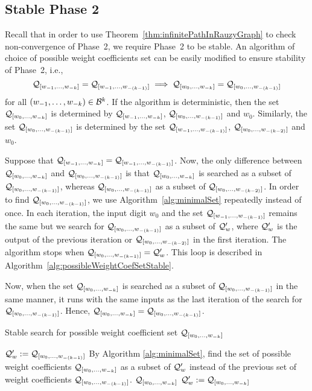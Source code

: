 \subsection*{Stable Phase 2}
Recall that in order to use Theorem~\ref{thm:infinitePathInRauzyGraph} to check non-convergence of Phase~2, we require Phase~2 to be stable. An algorithm of choice of possible weight coefficients set can be easily modified to ensure stability of Phase~2, i.e., 
$$\Qw{1}{k}=\Qw{1}{(k-1)} \implies \Qwo{k}=\Qwo{(k-1)}$$
for all $\tuple{1}{k}\in\B^k$. If the algorithm is deterministic, then the set $\Qwo{k}$ is determined by $\Qw{1}{k}$, $\Qwo{(k-1)}$ and $w_0$. Similarly, the set $\Qwo{(k-1)}$ is determined by  the set $\Qw{1}{(k-1)}$, $\Qwo{(k-2)}$ and $w_0$. 

Suppose that $\Qw{1}{k}=\Qw{1}{(k-1)}$. Now, the only difference between $\Qwo{k}$ and $\Qwo{(k-1)}$ is that $\Qwo{k}$ is searched as a subset of $\Qwo{(k-1)}$, whereas $\Qwo{(k-1)}$ as a subset of $\Qwo{(k-2)}$. In order to find  $\Qwo{(k-1)}$, we use Algorithm~\ref{alg:minimalSet} repeatedly instead of once. In each iteration, the input digit $w_0$ and the set $\Qw{1}{(k-1)}$ remains the same but we search for $\Qwo{(k-1)}$ as a subset of $\Q'_w$, where $\Q'_w$ is the output of the previous iteration or $\Qwo{(k-2)}$ in the first iteration. The algorithm stops when $\Qwo{(k-1)}=\Q'_w$. This loop is described in Algorithm~\ref{alg:possibleWeightCoefSetStable}.

Now, when the set $\Qwo{k}$ is searched as a subset of $\Qwo{(k-1)}$ in the same manner, it runs with the same inputs as the last iteration of the search for  $\Qwo{(k-1)}$. Hence, $\Qwo{k}=\Qwo{(k-1)}$.


\begin{algorithm}
  \caption{Stable search for possible weight coefficient set $\Qwo{k}$}
    \label{alg:possibleWeightCoefSetStable}
  \begin{algorithmic}[1]
	\STATE $\Q'_w:=\Qwo{(k-1)}$
		\STATE By Algorithm \ref{alg:minimalSet}, find the set of possible weight coefficients  $\Qwo{k}$ as a subset of $\Q'_w$ instead of the previous set of weight coefficients $\Qwo{(k-1)}$.
			\RETURN $\Qwo{k}$
		\ENDIF
		\STATE $\Q'_w:=\Qwo{k}$
	\ENDWHILE
  \end{algorithmic}
\end{algorithm}


